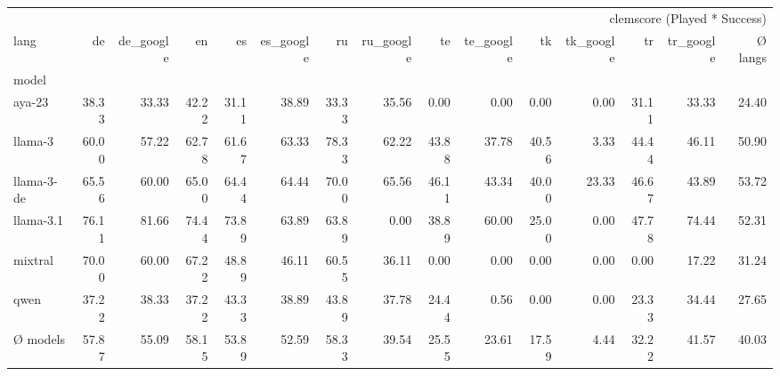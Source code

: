 \begin{tabular}{lrrrrrrrrrrrrrr}
\toprule
 & \multicolumn{14}{r}{clemscore (Played * Success)} \\
lang & de & de_google & en & es & es_google & ru & ru_google & te & te_google & tk & tk_google & tr & tr_google & Ø langs \\
model &  &  &  &  &  &  &  &  &  &  &  &  &  &  \\
\midrule
aya-23 & 38.33 & 33.33 & 42.22 & 31.11 & 38.89 & 33.33 & 35.56 & 0.00 & 0.00 & 0.00 & 0.00 & 31.11 & 33.33 & 24.40 \\
llama-3 & 60.00 & 57.22 & 62.78 & 61.67 & 63.33 & 78.33 & 62.22 & 43.88 & 37.78 & 40.56 & 3.33 & 44.44 & 46.11 & 50.90 \\
llama-3-de & 65.56 & 60.00 & 65.00 & 64.44 & 64.44 & 70.00 & 65.56 & 46.11 & 43.34 & 40.00 & 23.33 & 46.67 & 43.89 & 53.72 \\
llama-3.1 & 76.11 & 81.66 & 74.44 & 73.89 & 63.89 & 63.89 & 0.00 & 38.89 & 60.00 & 25.00 & 0.00 & 47.78 & 74.44 & 52.31 \\
mixtral & 70.00 & 60.00 & 67.22 & 48.89 & 46.11 & 60.55 & 36.11 & 0.00 & 0.00 & 0.00 & 0.00 & 0.00 & 17.22 & 31.24 \\
qwen & 37.22 & 38.33 & 37.22 & 43.33 & 38.89 & 43.89 & 37.78 & 24.44 & 0.56 & 0.00 & 0.00 & 23.33 & 34.44 & 27.65 \\
Ø models & 57.87 & 55.09 & 58.15 & 53.89 & 52.59 & 58.33 & 39.54 & 25.55 & 23.61 & 17.59 & 4.44 & 32.22 & 41.57 & 40.03 \\
\bottomrule
\end{tabular}
